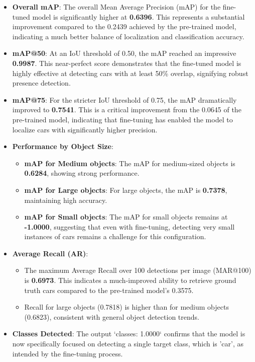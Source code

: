 \documentclass[12pt,a4paper]{article}
\begin{document}
\begin{itemize}
    \item \textbf{Overall mAP}: The overall Mean Average Precision (mAP) for the fine-tuned model is significantly higher at \textbf{0.6396}. This represents a substantial improvement compared to the 0.2439 achieved by the pre-trained model, indicating a much better balance of localization and classification accuracy.
    \item \textbf{mAP@50}: At an IoU threshold of 0.50, the mAP reached an impressive \textbf{0.9987}. This near-perfect score demonstrates that the fine-tuned model is highly effective at detecting cars with at least 50\% overlap, signifying robust presence detection.
    \item \textbf{mAP@75}: For the stricter IoU threshold of 0.75, the mAP dramatically improved to \textbf{0.7541}. This is a critical improvement from the 0.0645 of the pre-trained model, indicating that fine-tuning has enabled the model to localize cars with significantly higher precision.
    \item \textbf{Performance by Object Size}:
    \begin{itemize}
        \item \textbf{mAP for Medium objects}: The mAP for medium-sized objects is \textbf{0.6284}, showing strong performance.
        \item \textbf{mAP for Large objects}: For large objects, the mAP is \textbf{0.7378}, maintaining high accuracy.
        \item \textbf{mAP for Small objects}: The mAP for small objects remains at \textbf{-1.0000}, suggesting that even with fine-tuning, detecting very small instances of cars remains a challenge for this configuration.
    \end{itemize}
    \item \textbf{Average Recall (AR)}:
    \begin{itemize}
        \item The maximum Average Recall over 100 detections per image (MAR@100) is \textbf{0.6973}. This indicates a much-improved ability to retrieve ground truth cars compared to the pre-trained model's 0.3575.
        \item Recall for large objects (0.7818) is higher than for medium objects (0.6823), consistent with general object detection trends.
    \end{itemize}
    \item \textbf{Classes Detected}: The output `classes: 1.0000` confirms that the model is now specifically focused on detecting a single target class, which is 'car', as intended by the fine-tuning process.
\end{itemize}
\end{document}

